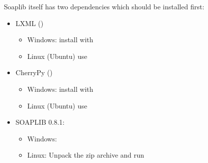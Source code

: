 \documentclass[letterpaper,10pt,english]{sphinxmanual}
\begin{document}
\sphinxAtStartPar
Soaplib itself has two dependencies which should be installed first:
\begin{itemize}
\item {} 
\sphinxAtStartPar
LXML ()
\begin{itemize}
\item {} 
\sphinxAtStartPar
Windows: install with 

\item {} 
\sphinxAtStartPar
Linux (Ubuntu) use 

\end{itemize}

\item {} 
\sphinxAtStartPar
CherryPy ()
\begin{itemize}
\item {} 
\sphinxAtStartPar
Windows: install with 

\item {} 
\sphinxAtStartPar
Linux (Ubuntu) use 

\end{itemize}

\item {} 
\sphinxAtStartPar
SOAPLIB 0.8.1:
\begin{itemize}
\item {} 
\sphinxAtStartPar
Windows: 

\item {} 
\sphinxAtStartPar
Linux: Unpack the zip archive and run 

\end{itemize}

\end{itemize}
\end{document}
